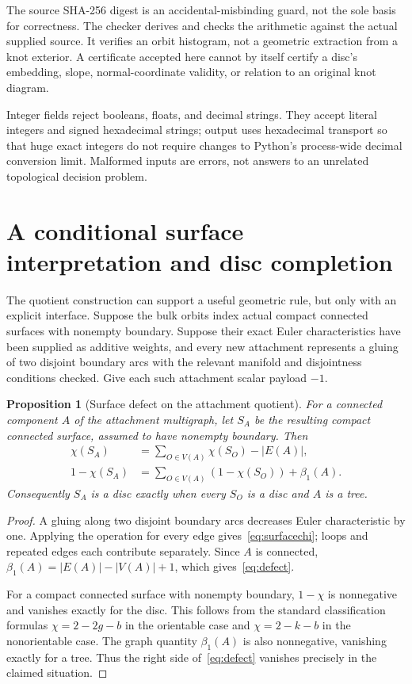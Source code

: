 \documentclass[11pt]{article}
\newtheorem{proposition}[theorem]{Proposition}
\theoremstyle{definition}
\begin{document}
The source SHA-256 digest is an accidental-misbinding guard, not the sole basis for correctness. The checker derives and checks the arithmetic against the actual supplied source. It verifies an orbit histogram, not a geometric extraction from a knot exterior. A certificate accepted here cannot by itself certify a disc's embedding, slope, normal-coordinate validity, or relation to an original knot diagram.

Integer fields reject booleans, floats, and decimal strings. They accept literal integers and signed hexadecimal strings; output uses hexadecimal transport so that huge exact integers do not require changes to Python's process-wide decimal conversion limit. Malformed inputs are errors, not answers to an unrelated topological decision problem.

\section{A conditional surface interpretation and disc completion}
\label{sec:surfaces}

The quotient construction can support a useful geometric rule, but only with an explicit interface. Suppose the bulk orbits index actual compact connected surfaces with nonempty boundary. Suppose their exact Euler characteristics have been supplied as additive weights, and every new attachment represents a gluing of two disjoint boundary arcs with the relevant manifold and disjointness conditions checked. Give each such attachment scalar payload $-1$.

\begin{proposition}[Surface defect on the attachment quotient]
\label{prop:disc}
For a connected component $A$ of the attachment multigraph, let $S_A$ be the resulting compact connected surface, assumed to have nonempty boundary. Then
\begin{align}
 \chi(S_A)&=\sum_{O\in V(A)}\chi(S_O)-|E(A)|,\label{eq:surfacechi}\\
 1-\chi(S_A)&=\sum_{O\in V(A)}(1-\chi(S_O))+\beta_1(A).
 \label{eq:defect}
\end{align}
Consequently $S_A$ is a disc exactly when every $S_O$ is a disc and $A$ is a tree.
\end{proposition}
\begin{proof}
A gluing along two disjoint boundary arcs decreases Euler characteristic by one. Applying the operation for every edge gives~\eqref{eq:surfacechi}; loops and repeated edges each contribute separately. Since $A$ is connected, $\beta_1(A)=|E(A)|-|V(A)|+1$, which gives~\eqref{eq:defect}.

For a compact connected surface with nonempty boundary, $1-\chi$ is nonnegative and vanishes exactly for the disc. This follows from the standard classification formulas $\chi=2-2g-b$ in the orientable case and $\chi=2-k-b$ in the nonorientable case. The graph quantity $\beta_1(A)$ is also nonnegative, vanishing exactly for a tree. Thus the right side of~\eqref{eq:defect} vanishes precisely in the claimed situation.
\end{proof}
\end{document}
